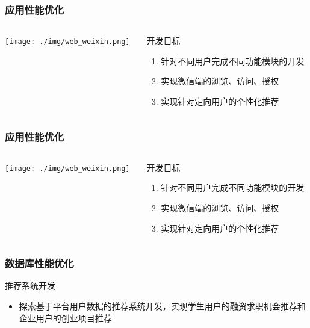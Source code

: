 \documentclass{beamer}
\begin{document}
\begin{frame}
  \frametitle{应用性能优化}
  \begin{columns}
    \begin{column}{0.50\textwidth}
      \texttt{[image: ./img/web\_weixin.png]}
    \end{column}
    \begin{column}{0.50\textwidth}
      \begin{block}{开发目标}
        \begin{enumerate}
          \item 针对不同用户完成不同功能模块的开发
          \item 实现微信端的浏览、访问、授权
          \item 实现针对定向用户的个性化推荐
        \end{enumerate}
      \end{block}
    \end{column}
  \end{columns}
\end{frame}

\begin{frame}
  \frametitle{应用性能优化}
  \begin{columns}
    \begin{column}{0.50\textwidth}
      \texttt{[image: ./img/web\_weixin.png]}
    \end{column}
    \begin{column}{0.50\textwidth}
      \begin{block}{开发目标}
        \begin{enumerate}
          \item 针对不同用户完成不同功能模块的开发
          \item 实现微信端的浏览、访问、授权
          \item 实现针对定向用户的个性化推荐
        \end{enumerate}
      \end{block}
    \end{column}
  \end{columns}
\end{frame}

\begin{frame}
\frametitle{数据库性能优化}
  \begin{block}{推荐系统开发}
  	\begin{itemize}
  		\item 探索基于平台用户数据的推荐系统开发，实现学生用户的融资求职机会推荐和企业用户的创业项目推荐
  	\end{itemize}
  \end{block}
\end{frame}
\end{document}
